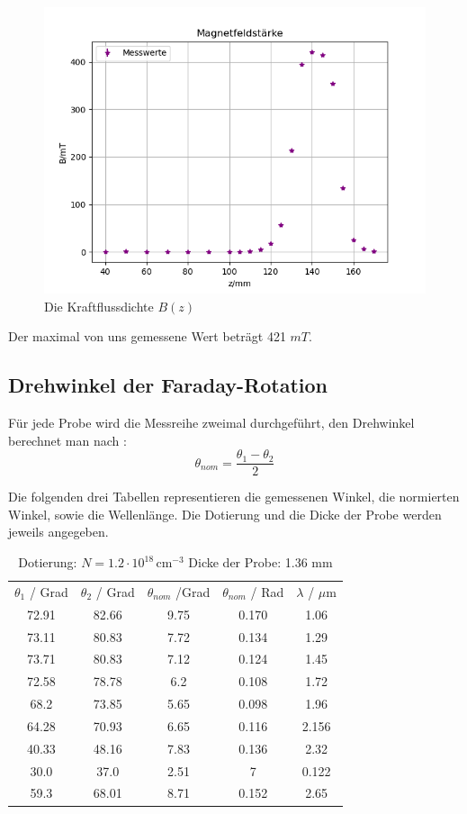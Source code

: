 \begin{figure}
    \centering
    \includegraphics[width=\textwidth]{Bilder/Magnetfeld.png}
    \caption{Die Kraftflussdichte \(B(z)\)}
    \label{fig: Abbildung 1}
\end{figure}
Der maximal von uns gemessene Wert beträgt 421 \(mT\).

\subsection{Drehwinkel der Faraday-Rotation}
Für jede Probe wird die Messreihe zweimal durchgeführt, den Drehwinkel berechnet man nach :
\begin{equation}
    \theta_{nom}=\frac{\theta_1-\theta_2}{2}
\end{equation}    

Die folgenden drei Tabellen representieren die gemessenen Winkel, die normierten Winkel, sowie die Wellenlänge. Die Dotierung und die Dicke der Probe werden jeweils angegeben. 


\begin{table}[h]
\centering
\caption{Dotierung: \( N = 1.2\cdot10^{18} \, \text{cm}^{-3} \)
Dicke der Probe: 1.36 mm}
\begin{tabular}{|c|c|c|c|c|}
\hline    
$\theta_1$ / Grad & $\theta_2$ / Grad & $\theta_{nom}$ /Grad & $\theta_{nom}$ / Rad & $\lambda$ / $\mu$m \\
72.91 & 82.66 & 9.75 & 0.170 & 1.06 \\
73.11 & 80.83 & 7.72 & 0.134 & 1.29 \\
73.71 & 80.83 & 7.12 & 0.124 & 1.45 \\ 
72.58 & 78.78 & 6.2 & 0.108 & 1.72 \\ 
68.2 & 73.85 & 5.65 & 0.098 & 1.96 \\
64.28 & 70.93 & 6.65 & 0.116 & 2.156 \\
40.33 & 48.16 & 7.83 & 0.136 &2.32 \\
30.0 & 37.0 & 2.51 & 7 & 0.122 \\
59.3 & 68.01 &8.71 & 0.152 & 2.65 \\
\hline
\end{tabular}
\label{tab:winkel_wellenlaenge1} 
\end{table}



